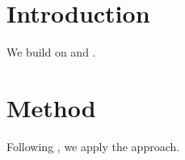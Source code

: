 \documentclass{article}
\begin{document}
\section{Introduction}
We build on \cite{knuth} and \cite{lamport}.

\section{Method}
Following \cite{knuth}, we apply the approach.


\end{document}
